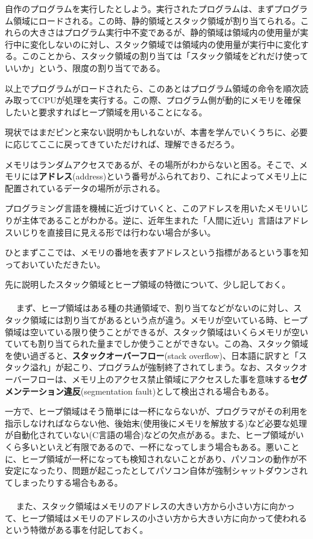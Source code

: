 自作のプログラムを実行したとしよう。実行されたプログラムは、まずプログラム領域にロードされる。この時、静的領域とスタック領域が割り当てられる。これらの大きさはプログラム実行中不変であるが、静的領域は領域内の使用量が実行中に変化しないのに対し、スタック領域では領域内の使用量が実行中に変化する。このことから、スタック領域の割り当ては「スタック領域をどれだけ使っていいか」という、限度の割り当てである。

以上でプログラムがロードされたら、このあとはプログラム領域の命令を順次読み取ってCPUが処理を実行する。この際、プログラム側が動的にメモリを確保したいと要求すればヒープ領域を用いることになる。

現状ではまだピンと来ない説明かもしれないが、本書を学んでいくうちに、必要に応じてここに戻ってきていただければ、理解できるだろう。

メモリはランダムアクセスであるが、その場所がわからないと困る。そこで、メモリには\textbf{アドレス}(address)という番号がふられており、これによってメモリ上に配置されているデータの場所が示される。

プログラミング言語を機械に近づけていくと、このアドレスを用いたメモリいじりが主体であることがわかる。逆に、近年生まれた「人間に近い」言語はアドレスいじりを直接目に見える形では行わない場合が多い。

ひとまずここでは、メモリの番地を表すアドレスという指標があるという事を知っておいていただきたい。

先に説明したスタック領域とヒープ領域の特徴について、少し記しておく。
\\ \\　
まず、ヒープ領域はある種の共通領域で、割り当てなどがないのに対し、スタック領域には割り当てがあるという点が違う。メモリが空いている時、ヒープ領域は空いている限り使うことができるが、スタック領域はいくらメモリが空いていても割り当てられた量までしか使うことができない。この為、スタック領域を使い過ぎると、\textbf{スタックオーバーフロー}(stack overflow)、日本語に訳すと「スタック溢れ」が起こり、プログラムが強制終了されてしまう。なお、スタックオーバーフローは、メモリ上のアクセス禁止領域にアクセスした事を意味する\textbf{セグメンテーション違反}(segmentation fault)として検出される場合もある。

一方で、ヒープ領域はそう簡単には一杯にならないが、プログラマがその利用を指示しなければならない他、後始末(使用後にメモリを解放する)など必要な処理が自動化されていない(C言語の場合)などの欠点がある。また、ヒープ領域がいくら多いといえど有限であるので、一杯になってしまう場合もある。悪いことに、ヒープ領域が一杯になっても検知されないことがあり、パソコンの動作が不安定になったり、問題が起こったとしてパソコン自体が強制シャットダウンされてしまったりする場合もある。
\\ \\　
また、スタック領域はメモリのアドレスの大きい方から小さい方に向かって、ヒープ領域はメモリのアドレスの小さい方から大きい方に向かって使われるという特徴がある事を付記しておく。


